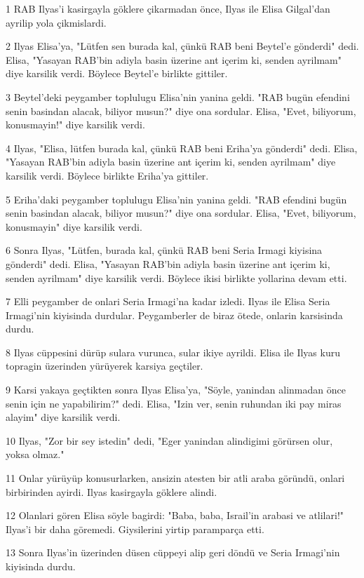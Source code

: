 \par 1 RAB Ilyas'i kasirgayla göklere çikarmadan önce, Ilyas ile Elisa Gilgal'dan ayrilip yola çikmislardi.
\par 2 Ilyas Elisa'ya, "Lütfen sen burada kal, çünkü RAB beni Beytel'e gönderdi" dedi. Elisa, "Yasayan RAB'bin adiyla basin üzerine ant içerim ki, senden ayrilmam" diye karsilik verdi. Böylece Beytel'e birlikte gittiler.
\par 3 Beytel'deki peygamber toplulugu Elisa'nin yanina geldi. "RAB bugün efendini senin basindan alacak, biliyor musun?" diye ona sordular. Elisa, "Evet, biliyorum, konusmayin!" diye karsilik verdi.
\par 4 Ilyas, "Elisa, lütfen burada kal, çünkü RAB beni Eriha'ya gönderdi" dedi. Elisa, "Yasayan RAB'bin adiyla basin üzerine ant içerim ki, senden ayrilmam" diye karsilik verdi. Böylece birlikte Eriha'ya gittiler.
\par 5 Eriha'daki peygamber toplulugu Elisa'nin yanina geldi. "RAB efendini bugün senin basindan alacak, biliyor musun?" diye ona sordular. Elisa, "Evet, biliyorum, konusmayin" diye karsilik verdi.
\par 6 Sonra Ilyas, "Lütfen, burada kal, çünkü RAB beni Seria Irmagi kiyisina gönderdi" dedi. Elisa, "Yasayan RAB'bin adiyla basin üzerine ant içerim ki, senden ayrilmam" diye karsilik verdi. Böylece ikisi birlikte yollarina devam etti.
\par 7 Elli peygamber de onlari Seria Irmagi'na kadar izledi. Ilyas ile Elisa Seria Irmagi'nin kiyisinda durdular. Peygamberler de biraz ötede, onlarin karsisinda durdu.
\par 8 Ilyas cüppesini dürüp sulara vurunca, sular ikiye ayrildi. Elisa ile Ilyas kuru topragin üzerinden yürüyerek karsiya geçtiler.
\par 9 Karsi yakaya geçtikten sonra Ilyas Elisa'ya, "Söyle, yanindan alinmadan önce senin için ne yapabilirim?" dedi. Elisa, "Izin ver, senin ruhundan iki pay miras alayim" diye karsilik verdi.
\par 10 Ilyas, "Zor bir sey istedin" dedi, "Eger yanindan alindigimi görürsen olur, yoksa olmaz."
\par 11 Onlar yürüyüp konusurlarken, ansizin atesten bir atli araba göründü, onlari birbirinden ayirdi. Ilyas kasirgayla göklere alindi.
\par 12 Olanlari gören Elisa söyle bagirdi: "Baba, baba, Israil'in arabasi ve atlilari!" Ilyas'i bir daha göremedi. Giysilerini yirtip paramparça etti.
\par 13 Sonra Ilyas'in üzerinden düsen cüppeyi alip geri döndü ve Seria Irmagi'nin kiyisinda durdu.
